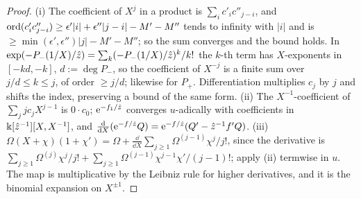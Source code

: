 \begin{proof}
(i) The coefficient of $X^j$ in a product is $\sum_ic'_ic''_{j-i}$, and $\operatorname{ord}(c'_ic''_{j-i})\geq\epsilon'|i|+\epsilon''|j-i|-M'-M''$ tends to infinity with $|i|$ and is $\geq\min(\epsilon',\epsilon'')|j|-M'-M''$; so the sum converges and the bound holds. In $\exp(-P_-(1/X)/\hat{z})=\sum_k(-P_-(1/X)/\hat{z})^k/k!$ the $k$-th term has $X$-exponents in $[-kd,-k]$, $d:=\deg P_-$, so the coefficient of $X^{-j}$ is a finite sum over $j/d\leq k\leq j$, of order $\geq j/d$; likewise for $P_+$. Differentiation multiplies $c_j$ by $j$ and shifts the index, preserving a bound of the same form. (ii) The $X^{-1}$-coefficient of $\sum_jjc_jX^{j-1}$ is $0\cdot c_0$; $\mathrm{e}^{-f_1/\hat{z}}$ converges $u$-adically with coefficients in $\Bbbk[\hat{z}^{-1}][X,X^{-1}]$, and $\frac{\mathrm{d}}{\mathrm{d} X}(\mathrm{e}^{-f/\hat{z}}Q)=\mathrm{e}^{-f/\hat{z}}(Q'-\hat{z}^{-1}f'Q)$. (iii) $\Omega(X+\chi)(1+\chi')=\Omega+\frac{\dd}{\dd X}\sum_{j\geq1}\Omega^{(j-1)}\chi^j/j!$, since the derivative is $\sum_{j\geq1}\Omega^{(j)}\chi^j/j!+\sum_{j\geq1}\Omega^{(j-1)}\chi^{j-1}\chi'/(j-1)!$; apply (ii) termwise in $u$. The map is multiplicative by the Leibniz rule for higher derivatives, and it is the binomial expansion on $X^{\pm1}$.
\end{proof}
